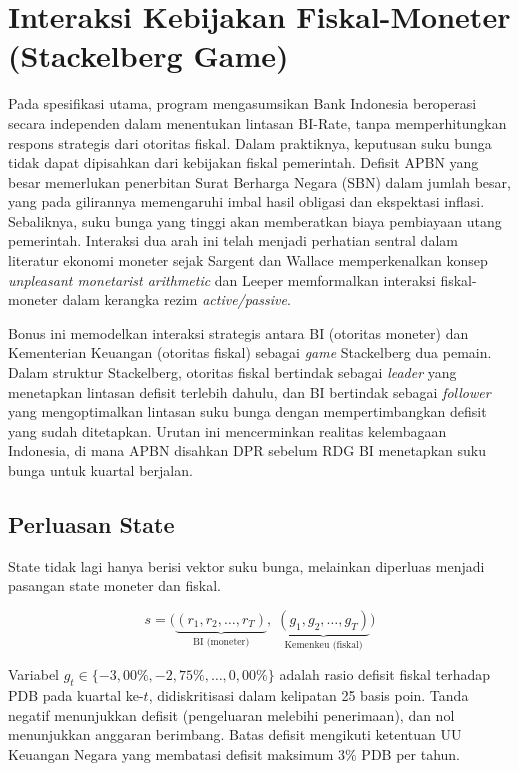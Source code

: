 \section{Interaksi Kebijakan Fiskal-Moneter (Stackelberg Game)}

Pada spesifikasi utama, program mengasumsikan Bank Indonesia beroperasi secara independen dalam menentukan lintasan BI-Rate, tanpa memperhitungkan respons strategis dari otoritas fiskal. Dalam praktiknya, keputusan suku bunga tidak dapat dipisahkan dari kebijakan fiskal pemerintah. Defisit APBN yang besar memerlukan penerbitan Surat Berharga Negara (SBN) dalam jumlah besar, yang pada gilirannya memengaruhi imbal hasil obligasi dan ekspektasi inflasi. Sebaliknya, suku bunga yang tinggi akan memberatkan biaya pembiayaan utang pemerintah. Interaksi dua arah ini telah menjadi perhatian sentral dalam literatur ekonomi moneter sejak Sargent dan Wallace \cite{sargent1981} memperkenalkan konsep \textit{unpleasant monetarist arithmetic} dan Leeper \cite{leeper1991} memformalkan interaksi fiskal-moneter dalam kerangka rezim \textit{active/passive}.

Bonus ini memodelkan interaksi strategis antara BI (otoritas moneter) dan Kementerian Keuangan (otoritas fiskal) sebagai \textit{game} Stackelberg dua pemain. Dalam struktur Stackelberg, otoritas fiskal bertindak sebagai \textit{leader} yang menetapkan lintasan defisit terlebih dahulu, dan BI bertindak sebagai \textit{follower} yang mengoptimalkan lintasan suku bunga dengan mempertimbangkan defisit yang sudah ditetapkan. Urutan ini mencerminkan realitas kelembagaan Indonesia, di mana APBN disahkan DPR sebelum RDG BI menetapkan suku bunga untuk kuartal berjalan.

\subsection{Perluasan State}

State tidak lagi hanya berisi vektor suku bunga, melainkan diperluas menjadi pasangan state moneter dan fiskal.

\[
    s = \Big( \underbrace{(r_1, r_2, \dots, r_T)}_{\text{BI (moneter)}},\; \underbrace{(g_1, g_2, \dots, g_T)}_{\text{Kemenkeu (fiskal)}} \Big)
\]

Variabel $g_t \in \{-3{,}00\%, -2{,}75\%, \dots, 0{,}00\%\}$ adalah rasio defisit fiskal terhadap PDB pada kuartal ke-$t$, didiskritisasi dalam kelipatan 25 basis poin. Tanda negatif menunjukkan defisit (pengeluaran melebihi penerimaan), dan nol menunjukkan anggaran berimbang. Batas defisit mengikuti ketentuan UU Keuangan Negara yang membatasi defisit maksimum 3\% PDB per tahun.

